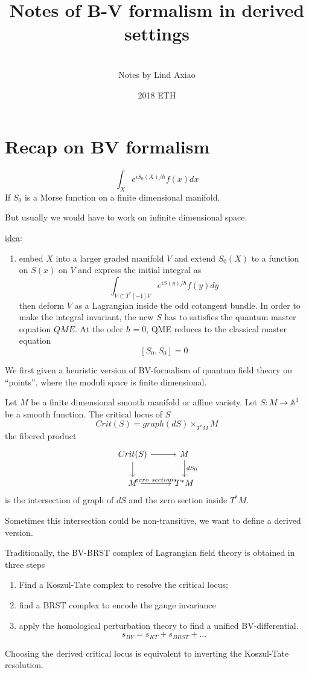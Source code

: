 \documentclass[11pt]{article}
\title{\bf Notes of B-V formalism in derived settings}
\author{\\
Notes by Lind Axiao}
\date{2018 ETH} %
\newcommand{\lrta}{\longrightarrow}
\begin{document}
\maketitle
\tableofcontents
\newpage

\section{Recap on BV formalism}
$$
\int_X e^{i S_0(X)/\hbar} f(x) dx
$$
If $S_0$ is a Morse function on a finite dimensional manifold.

But usually we would have to work on infinite dimensional space.

\underline{idea}: 
\begin{enumerate}
\item embed $X$ into a larger graded manifold $V$ and extend $S_0(X)$ to a function on $S(x)$ on $V$ and express the initial integral as
$$
\int_{V\subset T^*[-1]V} e^{i S(y)/\hbar}f(y) dy
$$
then deform $V$ as a Lagrangian inside the odd cotangent bundle. In order to make the integral invariant, the new $S$ has to satisfies the quantum master equation $QME$. At the oder $\hbar=0$, QME reduces to the classical master equation
$$
[S_{0},S_{0}]=0
$$
\end{enumerate}

We first given a heuristic version of BV-formalism of quantum field theory on ``points'', where the moduli space is finite dimensional.

Let $M$ be a finite dimensional smooth manifold or affine variety.
Let $S:M\lrta \mathbb{A}^1$ be a smooth function. The critical locus of $S$
$$
Crit(S)=graph(dS)\times_{T^*M}M
$$
the fibered product
$$
\begin{tikzcd}
Crit(S) \arrow[d] \arrow[r] & M \arrow[d, "dS_0"] \\
M \arrow[r, "zero\ sections"] & T^*M
\end{tikzcd}
$$
is the intersection of graph of $dS$ and the zero section inside $T^*M$. 

Sometimes this intersection could be non-transitive, we want to define a derived version.

Traditionally, the BV-BRST complex of Lagrangian field theory is obtained in three steps
\begin{enumerate}
\item Find a Koszul-Tate complex to resolve the critical locus;
\item find a BRST complex to encode the gauge invariance
\item apply the homological perturbation theory to find a unified BV-differential.
$$
s_{BV}=s_{KT}+s_{BRST}+...
$$
\end{enumerate}
Choosing the derived critical locus is equivalent to inverting the Koszul-Tate resolution.
\end{document}

